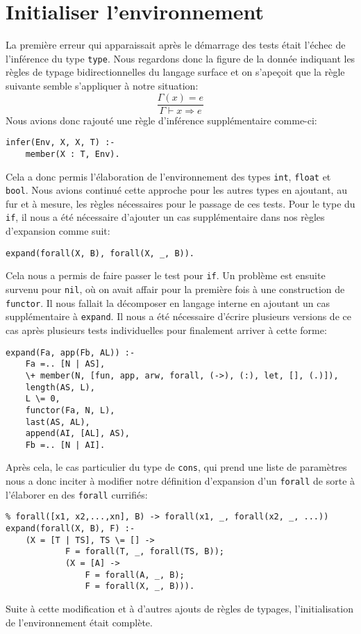 \documentclass[12pt, titlepage]{article}
\begin{document}
\section{Initialiser l'environnement}
La première erreur qui apparaissait après le démarrage des tests était l'échec
de l'inférence du type \texttt{type}. Nous regardons donc la figure de la
donnée indiquant les règles de typage bidirectionnelles du langage surface et
on s'apeçoit que la règle suivante semble s'appliquer à notre situation:
\begin{equation}
    \frac {\Gamma(x) = e} {\Gamma \vdash x \Rightarrow e}
\end{equation}
Nous avions donc rajouté une règle d'inférence supplémentaire comme-ci:
\begin{lstlisting}
infer(Env, X, X, T) :-
    member(X : T, Env).
\end{lstlisting}
Cela a donc permis l'élaboration de l'environnement des types \texttt{int},
\texttt{float} et \texttt{bool}. Nous avions continué cette approche pour les
autres types en ajoutant, au fur et à mesure, les règles nécessaires pour le
passage de ces tests. Pour le type du \texttt{if}, il nous a été nécessaire
d'ajouter un cas supplémentaire dans nos règles d'expansion comme suit:
\begin{lstlisting}
expand(forall(X, B), forall(X, _, B)).
\end{lstlisting}
Cela nous a permis de faire passer le test pour \texttt{if}. Un problème est
ensuite survenu pour \texttt{nil}, où on avait affair pour la première fois
à une construction de \texttt{functor}. Il nous fallait la décomposer en
langage interne en ajoutant un cas supplémentaire à \texttt{expand}. Il nous a
été nécessaire d'écrire plusieurs versions de ce cas après plusieurs tests
individuelles pour finalement arriver à cette forme:
\begin{lstlisting}
expand(Fa, app(Fb, AL)) :-
    Fa =.. [N | AS],
    \+ member(N, [fun, app, arw, forall, (->), (:), let, [], (.)]),
    length(AS, L),
    L \= 0,
    functor(Fa, N, L),
    last(AS, AL),
    append(AI, [AL], AS),
    Fb =.. [N | AI].
\end{lstlisting}
Après cela, le cas particulier du type de \texttt{cons}, qui prend une liste de
paramètres nous a donc inciter à modifier notre définition d'expansion d'un
\texttt{forall} de sorte à l'élaborer en des \texttt{forall} currifiés:
\begin{lstlisting}
% forall([x1, x2,...,xn], B) -> forall(x1, _, forall(x2, _, ...))
expand(forall(X, B), F) :-
    (X = [T | TS], TS \= [] ->
            F = forall(T, _, forall(TS, B));
            (X = [A] ->
                F = forall(A, _, B);
                F = forall(X, _, B))).
\end{lstlisting}
Suite à cette modification et à d'autres ajouts de règles de typages,
l'initialisation de l'environnement était complète.
\end{document}
